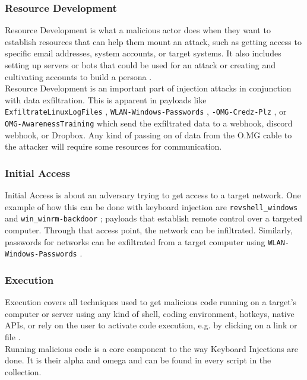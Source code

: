 \subsubsection{Resource Development}

Resource Development is what a malicious actor does when they want to establish resources that can help them mount an attack, such as getting access to specific email addresses, system accounts, or target systems. It also includes setting up servers or bots that could be used for an attack or creating and cultivating accounts to build a persona \cite{MITREATTCK}.\\
Resource Development is an important part of injection attacks in conjunction with data exfiltration. This is apparent in payloads like \verb|ExfiltrateLinuxLogFiles| \cite{OmgpayloadsPayloadsLibrary}, \verb|WLAN-Windows-Passwords| \cite{OmgpayloadsPayloadsLibrary}, \verb|-OMG-Credz-Plz| \cite{OmgpayloadsPayloadsLibrary}, or \verb|OMG-AwarenessTraining| \cite{OmgpayloadsPayloadsLibrary} which send the exfiltrated data to a webhook, discord webhook, or Dropbox. Any kind of passing on of data from the O.MG cable to the attacker will require some resources for communication. 


\subsubsection{Initial Access}

Initial Access is about an adversary trying to get access to a target network\cite{MITREATTCK}. One example of how this can be done with keyboard injection are \verb|revshell_windows| and \verb|win_winrm-backdoor| \cite{OmgpayloadsPayloadsLibrary}; payloads that establish remote control over a targeted computer. Through that access point, the network can be infiltrated. Similarly, passwords for networks can be exfiltrated from a target computer using \verb|WLAN-Windows-Passwords| \cite{OmgpayloadsPayloadsLibrary}.\\

\subsubsection{Execution}

Execution covers all techniques used to get malicious code running on a target's computer or server using any kind of shell, coding environment, hotkeys, native APIs, or rely on the user to activate code execution, e.g. by clicking on a link or file \cite{MITREATTCK}.\\
Running malicious code is a core component to the way Keyboard Injections are done. It is their alpha and omega and can be found in every script in the collection.

